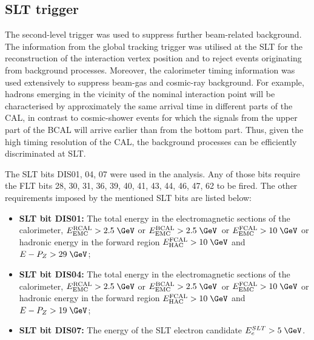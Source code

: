 \subsection{SLT trigger}
\label{subsec:sltcuts}
The second-level trigger was used to suppress further beam-related background. The information from the \zeus global tracking trigger was utilised at the SLT for the reconstruction of the interaction vertex position and to reject events originating from background processes. Moreover, the calorimeter timing information was used extensively to suppress beam-gas and cosmic-ray background. For example, hadrons emerging in the vicinity of the nominal interaction point will be characterised by approximately the same arrival time in different parts of the CAL, in contrast to cosmic-shower events for which the signals from the upper part of the BCAL will arrive earlier than from the bottom part. Thus, given the high timing resolution of the CAL, the background processes can be efficiently discriminated at SLT.

The SLT bits DIS01, 04, 07 were used in the analysis. Any of those bits require the FLT bits 28, 30, 31, 36, 39, 40, 41, 43, 44, 46, 47, 62 to be fired. The other requirements imposed by the mentioned SLT bits are listed below:
\begin{itemize}
	\item \textbf{SLT bit DIS01:} The total energy in the electromagnetic sections of the calorimeter, $E_\text{EMC}^\text{RCAL} > 2.5\;\GeV$ or $E_\text{EMC}^\text{BCAL} > 2.5\;\GeV$~or $E_\text{EMC}^\text{FCAL} > 10\;\GeV$ or hadronic energy in the forward region $E_\text{HAC}^\text{FCAL} > 10\;\GeV$ and $E-P_Z > 29\;\GeV$;
	\item \textbf{SLT bit DIS04:} The total energy in the electromagnetic sections of the calorimeter, $E_\text{EMC}^\text{RCAL} > 2.5\;\GeV$ or $E_\text{EMC}^\text{BCAL} > 2.5\;\GeV$~or $E_\text{EMC}^\text{FCAL} > 10\;\GeV$ or hadronic energy in the forward region $E_\text{HAC}^\text{FCAL} > 10\;\GeV$ and $E-P_Z > 19\;\GeV$;
	\item \textbf{SLT bit DIS07:} The energy of the SLT electron candidate $E_e^{SLT}>5\;\GeV$.
\end{itemize}
